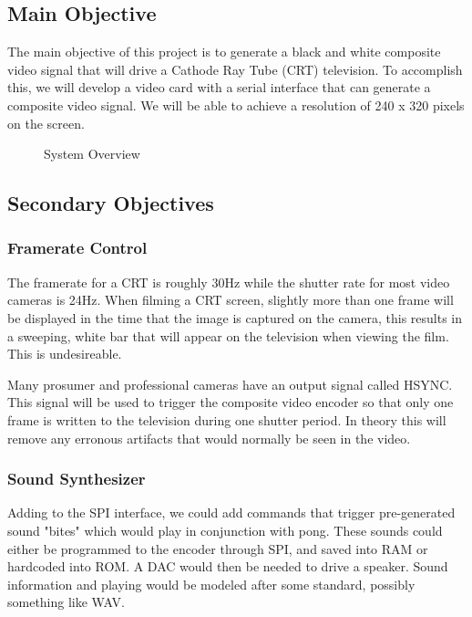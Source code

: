 \subsection*{Main Objective}

The main objective of this project is to generate a black and white composite
video signal that will drive a Cathode Ray Tube (CRT) television. To accomplish
this, we will develop a video card with a serial interface that can generate a
composite video signal. We will be able to achieve a resolution of 240 x 320
pixels on the screen.

\begin{figure}
   \centering
   \caption{System Overview}
\end{figure}

\subsection*{Secondary Objectives}

\subsubsection*{Framerate Control}

The framerate for a CRT is roughly 30Hz while the shutter rate for most video
cameras is 24Hz. When filming a CRT screen, slightly more than one frame will be
displayed in the time that the image is captured on the camera, this results in
a sweeping, white bar that will appear on the television when viewing the film.
This is undesireable.

Many prosumer and professional cameras have an output signal called HSYNC. This
signal will be used to trigger the composite video encoder so that only one
frame is written to the television during one shutter period. In theory this
will remove any erronous artifacts that would normally be seen in the video.

\subsubsection*{Sound Synthesizer}

Adding to the SPI interface, we could add commands that trigger pre-generated
sound "bites" which would play in conjunction with pong. These sounds could
either be programmed to the encoder through SPI, and saved into RAM or hardcoded
into ROM. A DAC would then be needed to drive a speaker. Sound information and
playing would be modeled after some standard, possibly something like WAV.


